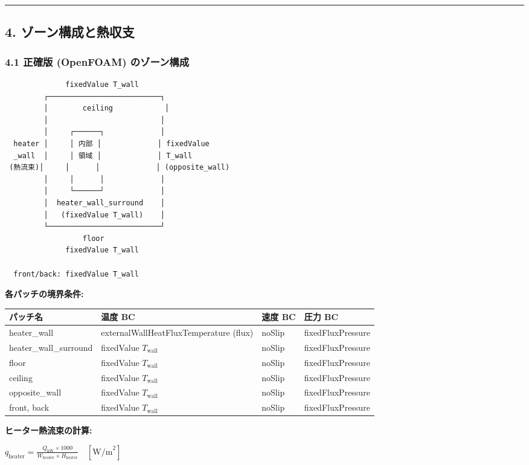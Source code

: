 \documentclass[a4paper,11pt]{article}
\begin{document}
\bigskip\hrule\bigskip

\subsection{4. ゾーン構成と熱収支}

\subsubsection{4.1 正確版 (OpenFOAM) のゾーン構成}

\begin{verbatim}
              fixedValue T_wall
         ┌──────────────────────────┐
         │        ceiling            │
         │                          │
         │     ┌──────┐             │
  heater │     │ 内部 │             │ fixedValue
  _wall  │     │ 領域 │             │ T_wall
 (熱流束)│     │      │             │ (opposite_wall)
         │     │      │             │
         │     └──────┘             │
         │  heater_wall_surround    │
         │   (fixedValue T_wall)    │
         └──────────────────────────┘
                  floor
              fixedValue T_wall

  front/back: fixedValue T_wall
\end{verbatim}

\textbf{各パッチの境界条件:}

{\small
\noindent
\begin{tabularx}{\textwidth}{|l|L|L|L|}
\hline
\textbf{パッチ名} & \textbf{温度 BC} & \textbf{速度 BC} & \textbf{圧力 BC} \\
\hline
heater\_wall & externalWallHeatFluxTemperature (flux) & noSlip & fixedFluxPressure \\
\hline
heater\_wall\_surround & fixedValue $T_{\text{wall}}$ & noSlip & fixedFluxPressure \\
\hline
floor & fixedValue $T_{\text{wall}}$ & noSlip & fixedFluxPressure \\
\hline
ceiling & fixedValue $T_{\text{wall}}$ & noSlip & fixedFluxPressure \\
\hline
opposite\_wall & fixedValue $T_{\text{wall}}$ & noSlip & fixedFluxPressure \\
\hline
front, back & fixedValue $T_{\text{wall}}$ & noSlip & fixedFluxPressure \\
\hline
\end{tabularx}
}


\textbf{ヒーター熱流束の計算:}

$
q_{\text{heater}} = \frac{Q_{\text{kW}} \times 1000}{W_{\text{heater}} \times H_{\text{heater}}} \quad [\text{W/m}^2]
$
\end{document}
